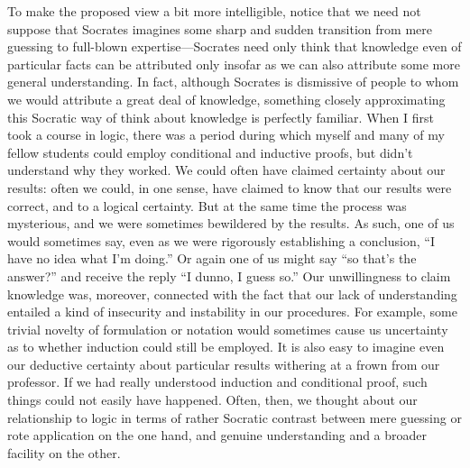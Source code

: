 \documentclass[11pt,letterpaper,oneside]{amsart} %
\begin{document}
To make the proposed view a bit more intelligible, notice that we need not suppose that Socrates imagines some sharp and sudden transition from mere guessing to full-blown expertise---Socrates need only think that knowledge even of particular facts can be attributed only insofar as we can also attribute some more  general understanding. In fact, although Socrates is dismissive of people to whom we would attribute a great deal of knowledge, something closely approximating this Socratic way of think about knowledge is perfectly familiar. When I first took a course in logic, there was a period during which myself and many of my fellow students could employ conditional and inductive proofs, but didn't understand why they worked. We could often have claimed certainty about our results: often we could, in one sense, have claimed to know that our results were correct, and to a logical certainty. But at the same time the process was mysterious, and we were sometimes bewildered by the results. As such, one of us would sometimes say, even as we were rigorously establishing a conclusion, ``I have no idea what I'm doing.'' Or again one of us might say ``so that's the answer?'' and receive the reply ``I dunno, I guess so.'' Our unwillingness to claim knowledge was, moreover, connected with the fact that our lack of understanding entailed a kind of insecurity and instability in our procedures. For example, some trivial novelty of formulation or notation would sometimes cause us uncertainty as to whether induction could still be employed. It is also easy to imagine even our deductive certainty about particular results withering at a frown from our professor. If we had really understood induction and conditional proof, such things could not easily have happened. Often, then, we thought about our relationship to logic in terms of rather Socratic contrast between mere guessing or rote application on the one hand, and genuine understanding and a broader facility on the other.


\end{document}
